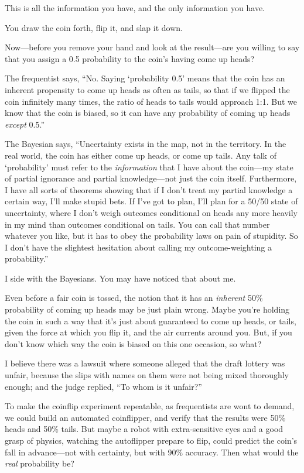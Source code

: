 {
 This is all the information you have, and the only information you
have.}

{
 You draw the coin forth, flip it, and slap it down.}

{
 Now---before you remove your hand and look at the result---are you
willing to say that you assign a 0.5 probability to the
coin's having come up heads?}

{
 The frequentist says, ``No. Saying
`probability 0.5' means that the coin
has an inherent propensity to come up heads as often as tails, so that
if we flipped the coin infinitely many times, the ratio of heads to
tails would approach 1:1. But we know that the coin is biased, so it
can have any probability of coming up heads \textit{except}
0.5.''}

{
 The Bayesian says, ``Uncertainty exists in the
map, not in the territory. In the real world, the coin has either come
up heads, or come up tails. Any talk of
`probability' must refer to the
\textit{information} that I have about the coin---my state of partial
ignorance and partial knowledge---not just the coin itself.
Furthermore, I have all sorts of theorems showing that if I
don't treat my partial knowledge a certain way,
I'll make stupid bets. If I've got to
plan, I'll plan for a 50/50 state of uncertainty, where
I don't weigh outcomes conditional on heads any more
heavily in my mind than outcomes conditional on tails. You can call
that number whatever you like, but it has to obey the probability laws
on pain of stupidity. So I don't have the slightest
hesitation about calling my outcome-weighting a
probability.''}

{
 I side with the Bayesians. You may have noticed that about me.}

{
 Even before a fair coin is tossed, the notion that it has an
\textit{inherent} 50\% probability of coming up heads may be just plain
wrong. Maybe you're holding the coin in such a way that
it's just about guaranteed to come up heads, or tails,
given the force at which you flip it, and the air currents around you.
But, if you don't know which way the coin is biased on
this one occasion, so what?}

{
 I believe there was a lawsuit where someone alleged that the draft
lottery was unfair, because the slips with names on them were not being
mixed thoroughly enough; and the judge replied, ``To
whom is it unfair?''}

{
 To make the coinflip experiment repeatable, as frequentists are
wont to demand, we could build an automated coinflipper, and verify
that the results were 50\% heads and 50\% tails. But maybe a robot with
extra-sensitive eyes and a good grasp of physics, watching the
autoflipper prepare to flip, could predict the coin's
fall in advance---not with certainty, but with 90\% accuracy. Then what
would the \textit{real} probability be?}

